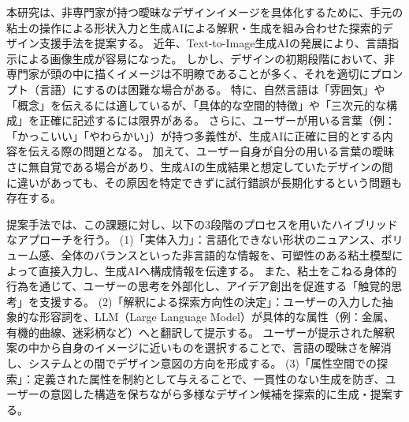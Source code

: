 \documentclass{kuisthesis}
\date{令和8年2月2日}
\begin{document}
\maketitle
\begin{jabstract}
本研究は、非専門家が持つ曖昧なデザインイメージを具体化するために、手元の粘土の操作による形状入力と生成AIによる解釈・生成を組み合わせた探索的デザイン支援手法を提案する。 
近年、Text-to-Image生成AIの発展により、言語指示による画像生成が容易になった。
しかし、デザインの初期段階において、非専門家が頭の中に描くイメージは不明瞭であることが多く、それを適切にプロンプト（言語）にするのは困難な場合がある。
特に、自然言語は「雰囲気」や「概念」を伝えるには適しているが、「具体的な空間的特徴」や「三次元的な構成」を正確に記述するには限界がある。
さらに、ユーザーが用いる言葉（例：「かっこいい」「やわらかい」）が持つ多義性が、生成AIに正確に目的とする内容を伝える際の問題となる。
加えて、ユーザー自身が自分の用いる言葉の曖昧さに無自覚である場合があり、生成AIの生成結果と想定していたデザインの間に違いがあっても、その原因を特定できずに試行錯誤が長期化するという問題も存在する。

提案手法では、この課題に対し、以下の3段階のプロセスを用いたハイブリッドなアプローチを行う。
(1)「実体入力」：言語化できない形状のニュアンス、ボリューム感、全体のバランスといった非言語的な情報を、可塑性のある粘土模型によって直接入力し、生成AIへ構成情報を伝達する。
また、粘土をこねる身体的行為を通じて、ユーザーの思考を外部化し、アイデア創出を促進する「触覚的思考」を支援する。
(2)「解釈による探索方向性の決定」：ユーザーの入力した抽象的な形容詞を、LLM（Large Language Model）が具体的な属性（例：金属、有機的曲線、迷彩柄など）へと翻訳して提示する。
ユーザーが提示された解釈案の中から自身のイメージに近いものを選択することで、言語の曖昧さを解消し、システムとの間でデザイン意図の方向を形成する。
(3)「属性空間での探索」：定義された属性を制約として与えることで、一貫性のない生成を防ぎ、ユーザーの意図した構造を保ちながら多様なデザイン候補を探索的に生成・提案する。


\end{jabstract}
\end{document}
